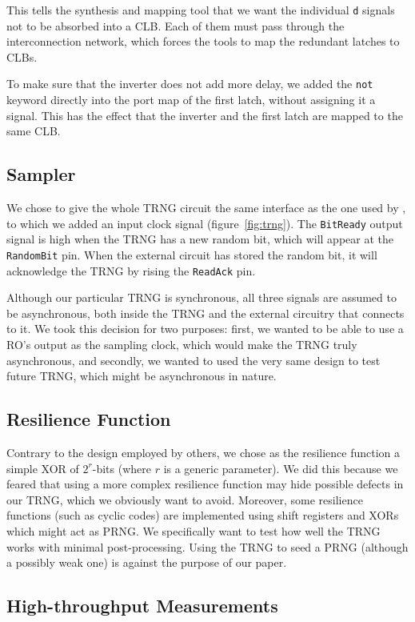 \documentclass[conference]{IEEEtran}
\begin{document}
This tells the synthesis and mapping tool that we want the individual {\tt d} signals not to be absorbed into a CLB. Each of them must pass through the interconnection network, which forces the tools to map the redundant latches to CLBs.

To make sure that the inverter does not add more delay, we added the {\tt not} keyword directly into the port map of the first latch, without assigning it a signal. This has the effect that the inverter and the first latch are mapped to the same CLB.

\subsection{Sampler}
We chose to give the whole TRNG circuit the same interface as the one used by \cite{Ko04}, to which we added an input clock signal (figure~\ref{fig:trng}). The {\tt BitReady} output signal is high when the TRNG has a new random bit, which will appear at the {\tt RandomBit} pin. When the external circuit has stored the random bit, it will acknowledge the TRNG by rising the {\tt ReadAck} pin.

Although our particular TRNG is synchronous, all three signals are assumed to be asynchronous, both inside the TRNG and the external circuitry that connects to it. We took this decision for two purposes: first, we wanted to be able to use a RO's output as the sampling clock, which would make the TRNG truly asynchronous, and secondly, we wanted to used the very same design to test future TRNG, which might be asynchronous in nature.

\subsection{Resilience Function}
Contrary to the design employed by others, we chose as the resilience function a simple XOR of $2^r$-bits (where $r$ is a generic parameter). We did this because we feared that using a more complex resilience function may hide possible defects in our TRNG, which we obviously want to avoid. Moreover, some resilience functions (such as cyclic codes) are implemented using shift registers and XORs which might act as PRNG. We specifically want to test how well the TRNG works with minimal post-processing. Using the TRNG to seed a PRNG (although a possibly weak one) is against the purpose of our paper.

\subsection{High-throughput Measurements}
\end{document}
